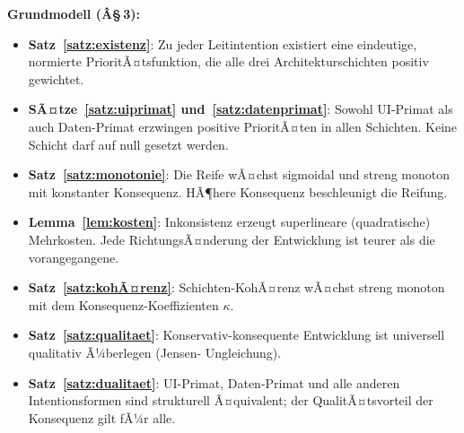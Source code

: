 ﻿\documentclass[a4paper,12pt]{article}
\theoremstyle{definition}
\begin{document}
\textbf{Grundmodell (Â§\,3):}
\begin{itemize}
    \item \textbf{Satz~\ref{satz:existenz}}: Zu jeder Leitintention
          existiert eine eindeutige, normierte PrioritÃ¤tsfunktion, die
          alle drei Architekturschichten positiv gewichtet.
    \item \textbf{SÃ¤tze~\ref{satz:uiprimat} und~\ref{satz:datenprimat}}:
          Sowohl UI-Primat als auch Daten-Primat erzwingen positive
          PrioritÃ¤ten in allen Schichten. Keine Schicht darf auf null
          gesetzt werden.
    \item \textbf{Satz~\ref{satz:monotonie}}: Die Reife wÃ¤chst sigmoidal
          und streng monoton mit konstanter Konsequenz. HÃ¶here Konsequenz
          beschleunigt die Reifung.
    \item \textbf{Lemma~\ref{lem:kosten}}: Inkonsistenz erzeugt
          superlineare (quadratische) Mehrkosten. Jede RichtungsÃ¤nderung
          der Entwicklung ist teurer als die vorangegangene.
    \item \textbf{Satz~\ref{satz:kohÃ¤renz}}: Schichten-KohÃ¤renz wÃ¤chst
          streng monoton mit dem Konsequenz-Koeffizienten $\kappa$.
    \item \textbf{Satz~\ref{satz:qualitaet}}: Konservativ-konsequente
          Entwicklung ist universell qualitativ Ã¼berlegen (Jensen-
          Ungleichung).
    \item \textbf{Satz~\ref{satz:dualitaet}}: UI-Primat, Daten-Primat
          und alle anderen Intentionsformen sind strukturell Ã¤quivalent;
          der QualitÃ¤tsvorteil der Konsequenz gilt fÃ¼r alle.
\end{itemize}
\end{document}
